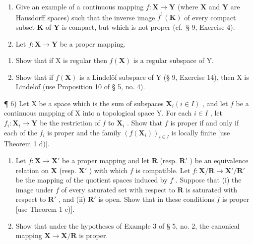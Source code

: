 \begin{enumerate}
\def\labelenumi{\arabic{enumi})}
\setcounter{enumi}{3}
\item
  Give an example of a continuous mapping \(f: \mathbf{X} \to \mathbf{Y}\) (where \(\mathbf{X}\) and \(\mathbf{Y}\) are Hausdorff spaces) such that the inverse image \(\overline{f}^1(\mathbf{K})\) of every compact subset \(\mathbf{K}\) of \(\mathbf{Y}\) is compact, but which is not proper (cf.~§ 9, Exercise 4).
\item
  Let \(f: \mathbf{X} \to \mathbf{Y}\) be a proper mapping.
\end{enumerate}

\begin{enumerate}
\def\labelenumi{\alph{enumi})}
\tightlist
\item
  Show that if X is regular then \(f(\mathbf{X})\) is a regular subspace of Y.
\item
  Show that if \(f(\mathbf{X})\) is a Lindelöf subspace of Y (§ 9, Exercise 14), then X is Lindelöf (use Proposition 10 of § 5, no. 4).
\end{enumerate}

¶ 6) Let X be a space which is the sum of subspaces \(\mathbf{X}_i (i \in I)\) , and let \(f\) be a continuous mapping of X into a topological space Y. For each \(i \in I\) , let \(f_i: \mathbf{X}_i \to \mathbf{Y}\) be the restriction of \(f\) to \(\mathbf{X}_i\) . Show that \(f\) is proper if and only if each of the \(f_i\) is proper and the family \((f(\mathbf{X}_i))_{i \in I}\) is locally finite {[}use Theorem 1 d){]}.

\begin{enumerate}
\def\labelenumi{\arabic{enumi})}
\setcounter{enumi}{6}
\item
  Let \(f: \mathbf{X} \to \mathbf{X}'\) be a proper mapping and let \(\mathbf{R}\) (resp. \(\mathbf{R}'\) ) be an equivalence relation on \(\mathbf{X}\) (resp. \(\mathbf{X}'\) ) with which \(f\) is compatible. Let \(\overline{f}: \mathbf{X} / \mathbf{R} \to \mathbf{X}' / \mathbf{R}'\) be the mapping of the quotient spaces induced by \(f\) . Suppose that (i) the image under \(f\) of every saturated set with respect to \(\mathbf{R}\) is saturated with respect to \(\mathbf{R}'\) , and (ii) \(\mathbf{R}'\) is open. Show that in these conditions \(\overline{f}\) is proper {[}use Theorem 1 c){]}.
\item
  Show that under the hypotheses of Example 3 of § 5, no. 2, the canonical mapping \(\mathbf{X} \to \mathbf{X} / \mathbf{R}\) is proper.
\end{enumerate}

